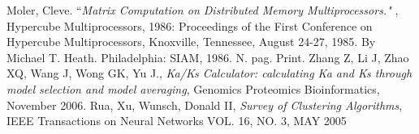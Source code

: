\documentclass[12pt]{article}
\begin{document}
\begin{thebibliography}{1}
Moler, Cleve. ``\emph{Matrix Computation on Distributed Memory Multiprocessors."
}, Hypercube Multiprocessors, 1986: Proceedings of the First Conference on
Hypercube Multiprocessors, Knoxville, Tennessee, August 24-27, 1985. By Michael
T. Heath. Philadelphia: SIAM, 1986. N. pag. Print.
Zhang Z, Li J, Zhao XQ, Wang J, Wong GK, Yu J., \emph{Ka/Ks Calculator: 
calculating Ka and Ks through model selection and model averaging},
Genomics Proteomics Bioinformatics, November 2006.
Rua, Xu, Wunsch, Donald II, \emph{Survey of Clustering Algorithms},
IEEE Transactions on Neural Networks VOL. 16, NO. 3, MAY 2005
\end{thebibliography}
\end{document}
